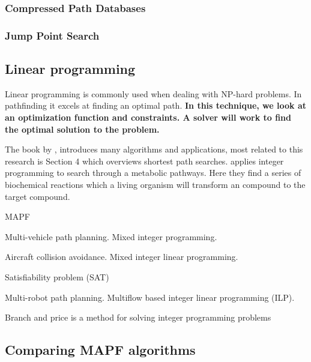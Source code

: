\documentclass[a4paper,11pt]{article}
\begin{document}
\subsubsection{Compressed Path Databases}

\subsubsection{Jump Point Search}

\cite{renukamurthy2016improving}

\subsection{Linear programming}
Linear programming is commonly used when dealing with NP-hard problems. In pathfinding it excels at finding an optimal path. \textbf{In this technique, we look at an optimization function and constraints. A solver will work to find the optimal solution to the problem.}

The book by \cite{ahuja1993network}, introduces many algorithms and applications, most related to this research is Section 4 which overviews shortest path searches. \cite{planes2009path} applies integer programming to search through a metabolic pathways. Here they find a series of biochemical reactions which a living organism will transform an compound to the target compound.

MAPF

\cite{schouwenaars2001mixed} Multi-vehicle path planning. Mixed integer programming.

\cite{richards2002aircraft} Aircraft collision avoidance. Mixed integer linear programming.

\cite{surynek2016efficient} Satisfiability problem (SAT)

\cite{yu2013planning} Multi-robot path planning. Multiflow based integer linear programming (ILP).

Branch and price is a method for solving integer programming problems





\subsection{Comparing MAPF algorithms}
\end{document}
